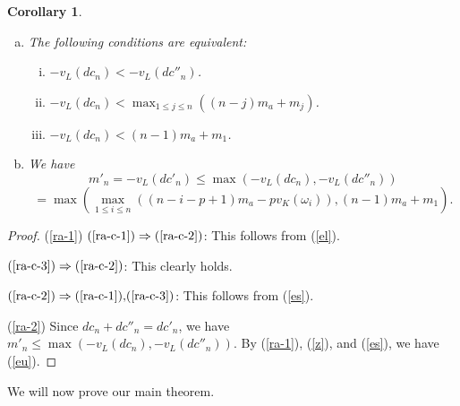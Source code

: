 \documentclass[sn-mathphys-num]{sn-jnl}
\numberwithin{equation}{section}
\theoremstyle{plain}
\newtheorem{coro}[theo]{Corollary}
\theoremstyle{definition}
\begin{document}
\begin{coro}\label{ra}
  \begin{enumerate}[(a)]
    \item\label{ra-1} The following conditions are equivalent:
  \begin{enumerate}[(i)]
  \item\label{ra-c-1} $-v_L(dc_n)<-v_L(dc''_n)$.
  \item\label{ra-c-2} $-v_L(dc_n)<\max_{1\leq j\leq n}((n-j)m_a+m_j)$.
  \item\label{ra-c-3} $-v_L(dc_n)<(n-1)m_a+m_1$.
  \end{enumerate}
\item\label{ra-2} We have
  \[
  m'_n=-v_L(dc'_n)\leq \max(-v_L(dc_n),-v_L(dc''_n))
  \]
  \begin{equation}\label{eu}
  =\max\left(\max_{1\leq i\leq n}\left((n-i-p+1)m_a-pv_K\left(\omega_i\right)\right),(n-1)m_a+m_1\right).
  \end{equation}
  \end{enumerate}
\end{coro}

\begin{proof}
  (\ref{ra-1}) $\text{(\ref{ra-c-1})}\Rightarrow\text{(\ref{ra-c-2})}$: This follows from (\ref{el}).

  $\text{(\ref{ra-c-3})}\Rightarrow\text{(\ref{ra-c-2})}$: This clearly holds.

  $\text{(\ref{ra-c-2})}\Rightarrow\text{(\ref{ra-c-1}),(\ref{ra-c-3})}$: This follows from (\ref{es}).

  (\ref{ra-2}) 
  Since $dc_n+dc''_n=dc'_n$, we have $m'_n\leq\max(-v_L(dc_n),-v_L(dc''_n))$. By (\ref{ra-1}), (\ref{z}), and (\ref{es}), we have (\ref{eu}).
\end{proof}

We will now prove our main theorem.
\end{document}
